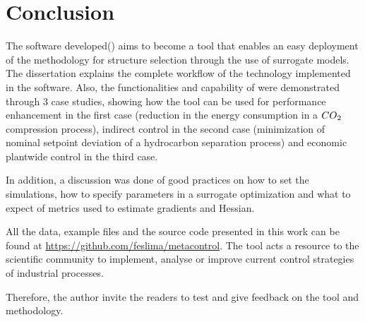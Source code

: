 \documentclass[../msc-thesis.tex]{subfiles}
\begin{document}
\chapter{Conclusion}

The software developed(\mtc) aims to become a tool that enables an easy 
deployment of the methodology for \soc structure selection through the use 
of surrogate models. The dissertation explains the complete workflow of the 
technology implemented in the software. Also, the functionalities 
and capability of \mtc were demonstrated through 3 case studies,
showing how the tool can be used for performance enhancement in the first case 
(reduction in the energy consumption in a $CO\textsubscript{2}$ compression 
process), indirect control in the second case (minimization of nominal setpoint 
deviation of a hydrocarbon separation process) and economic plantwide control 
in the third case.

In addition, a discussion was done of good practices on how to set the 
simulations, how to specify parameters in a surrogate optimization and what to 
expect of metrics used to estimate gradients and Hessian.

All the data, example files and the \mtc source code presented 
in this work can be found at \url{https://github.com/feslima/metacontrol}. The 
tool acts a resource to the scientific community to implement, analyse or 
improve current control strategies of industrial processes.

Therefore, the author invite the readers to test and give feedback on the tool 
and methodology.
\end{document}
